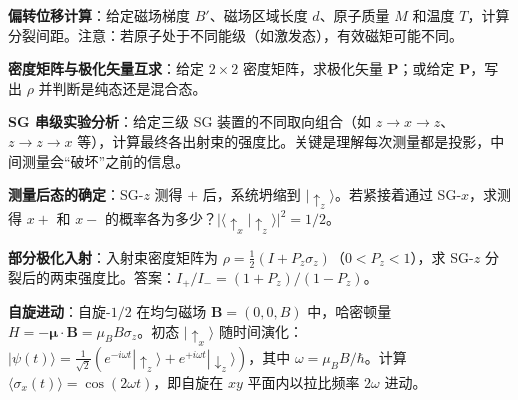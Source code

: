 \begin{drillbox}[训练点与考法变体]
 \textbf{偏转位移计算}：给定磁场梯度 $B'$、磁场区域长度 $d$、原子质量 $M$ 和温度 $T$，计算分裂间距。注意：若原子处于不同能级（如激发态），有效磁矩可能不同。

 \textbf{密度矩阵与极化矢量互求}：给定 $2\times2$ 密度矩阵，求极化矢量 $\mathbf{P}$；或给定 $\mathbf{P}$，写出 $\rho$ 并判断是纯态还是混合态。

 \textbf{SG 串级实验分析}：给定三级 SG 装置的不同取向组合（如 $z\to x\to z$、$z\to z\to x$ 等），计算最终各出射束的强度比。关键是理解每次测量都是投影，中间测量会``破坏''之前的信息。

 \textbf{测量后态的确定}：SG-$z$ 测得 $+$ 后，系统坍缩到 $|\uparrow_z\rangle$。若紧接着通过 SG-$x$，求测得 $x+$ 和 $x-$ 的概率各为多少？$|\langle\uparrow_x|\uparrow_z\rangle|^2=1/2$。

 \textbf{部分极化入射}：入射束密度矩阵为 $\rho=\frac12(I+P_z\sigma_z)$（$0<P_z<1$），求 SG-$z$ 分裂后的两束强度比。答案：$I_+/I_-=(1+P_z)/(1-P_z)$。

 \textbf{自旋进动}：自旋-$1/2$ 在均匀磁场 $\mathbf{B}=(0,0,B)$ 中，哈密顿量 $H=-\boldsymbol{\mu}\cdot\mathbf{B}=\mu_B B\sigma_z$。初态 $|\uparrow_x\rangle$ 随时间演化：$|\psi(t)\rangle=\frac{1}{\sqrt{2}}(e^{-i\omega t}|\uparrow_z\rangle+e^{+i\omega t}|\downarrow_z\rangle)$，其中 $\omega=\mu_B B/\hbar$。计算 $\langle\sigma_x(t)\rangle=\cos(2\omega t)$，即自旋在 $xy$ 平面内以拉比频率 $2\omega$ 进动。
\end{drillbox}

